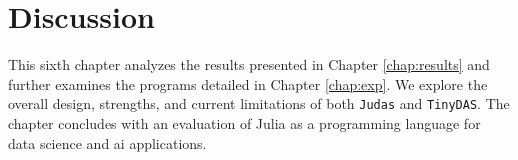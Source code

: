 \chapter{Discussion}
\label{chap:disc}

This sixth chapter analyzes the results presented in Chapter \ref{chap:results} and further examines the programs detailed in Chapter \ref{chap:exp}. We explore the overall design, strengths, and current limitations of both \texttt{Judas} and \texttt{TinyDAS}. The chapter concludes with an evaluation of Julia as a programming language for data science and \acrshort{ai} applications.


%





